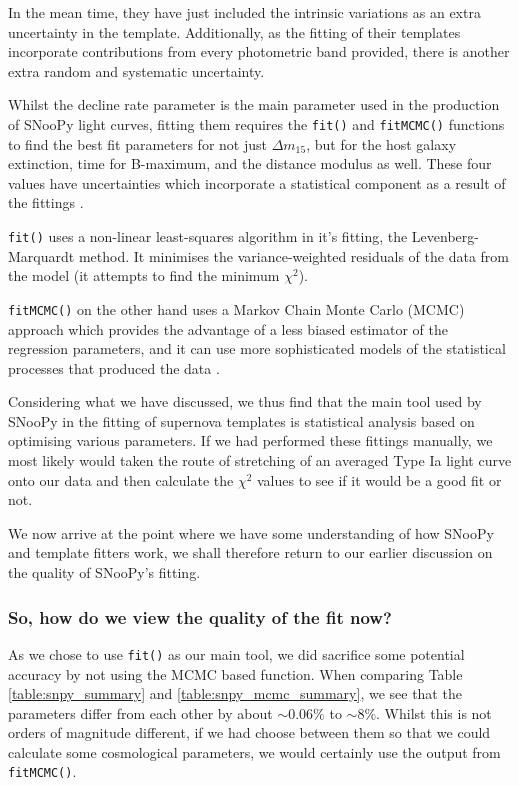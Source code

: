 \documentclass[twocolumn]{revtex4}
\begin{document}
In the mean time, they have just included the intrinsic variations as an extra uncertainty in the template. Additionally, as the fitting of their templates incorporate contributions from every photometric band provided, there is another extra random and systematic uncertainty.

Whilst the decline rate parameter is the main parameter used in the production of SNooPy light curves, fitting them requires the \texttt{fit()} and \texttt{fitMCMC()} functions to find the best fit parameters for not just $\Delta m_{15}$, but for the host galaxy extinction, time for B-maximum, and the distance modulus as well. These four values have uncertainties which incorporate a statistical component as a result of the fittings \cite{car_snoopy}.  

\texttt{fit()} uses a non-linear least-squares algorithm in it's fitting, the Levenberg-Marquardt method. It minimises the variance-weighted residuals of the data from the model \cite{snoopy_online_docs} (it attempts to find the minimum $\chi^2$). 

\texttt{fitMCMC()} on the other hand uses a Markov Chain Monte Carlo (MCMC) approach which provides the advantage of a less biased estimator of the regression parameters, and it can use more sophisticated models of the statistical processes that produced the data \cite{car_snoopy}. 

Considering what we have discussed, we thus find that the main tool used by SNooPy in the fitting of supernova templates is statistical analysis based on optimising various parameters. If we had performed these fittings manually, we most likely would taken the route of stretching of an averaged Type Ia light curve onto our data and then calculate the $\chi^2$ values to see if it would be a good fit or not.

We now arrive at the point where we have some understanding of how SNooPy and template fitters work, we shall therefore return to our earlier discussion on the quality of SNooPy's fitting. 

\vspace{-3ex}
\subsubsection{So, how do we view the quality of the fit now?}
\vspace{-2ex}

As we chose to use \texttt{fit()} as our main tool, we did sacrifice some potential accuracy by not using the MCMC based function. When comparing Table \ref{table:snpy_summary} and \ref{table:snpy_mcmc_summary}, we see that the parameters differ from each other by about $\sim0.06\%$ to $\sim8\%$. Whilst this is not orders of magnitude different, if we had choose between them so that we could calculate some cosmological parameters, we would certainly use the output from \texttt{fitMCMC()}.
\end{document}
